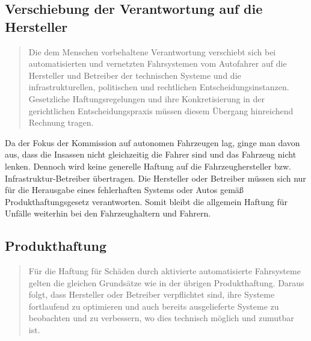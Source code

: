 \documentclass[twoside,a4paper,12pt]{article}
\begin{document}
\subsection{Verschiebung der Verantwortung auf die Hersteller} \label{VerschiebungDerVerantwortungAufDieHersteller}

\begin{quote}
\glqq
Die dem Menschen vorbehaltene Verantwortung verschiebt sich bei automatisierten und
vernetzten Fahrsystemen vom Autofahrer auf die Hersteller und Betreiber der technischen Systeme und die infrastrukturellen, 
politischen und rechtlichen Entscheidungsinstanzen. Gesetzliche Haftungsregelungen und ihre Konkretisierung in der gerichtlichen
Entscheidungspraxis müssen diesem Übergang hinreichend Rechnung tragen.\grqq\mbox{~\cite[S. 11]{ek}}
\end{quote}
Da der Fokus der Kommission auf autonomen Fahrzeugen lag, ginge man davon aus, dass die Insassen nicht gleichzeitig die Fahrer sind und das Fahrzeug nicht lenken. Dennoch wird keine generelle Haftung auf die Fahrzeughersteller bzw. Infrastruktur-Betreiber übertragen. Die Hersteller oder Betreiber müssen sich nur für die Herausgabe eines fehlerhaften Systems oder Autos gemäß Produkthaftungsgesetz verantworten. Somit bleibt die allgemein Haftung für Unfälle weiterhin bei den Fahrzeughaltern und Fahrern.

\subsection{Produkthaftung} \label{Produkthaftung}

\begin{quote}
\glqq
Für die Haftung für Schäden durch aktivierte automatisierte Fahrsysteme gelten die gleichen Grundsätze wie in der übrigen 
Produkthaftung. Daraus folgt, dass Hersteller oder
Betreiber verpflichtet sind, ihre Systeme fortlaufend zu optimieren und auch bereits ausgelieferte Systeme zu beobachten und zu 
verbessern, wo dies technisch möglich und zumutbar ist.\grqq\mbox{~\cite[S. 12]{ek}}
\end{quote}
\end{document}
